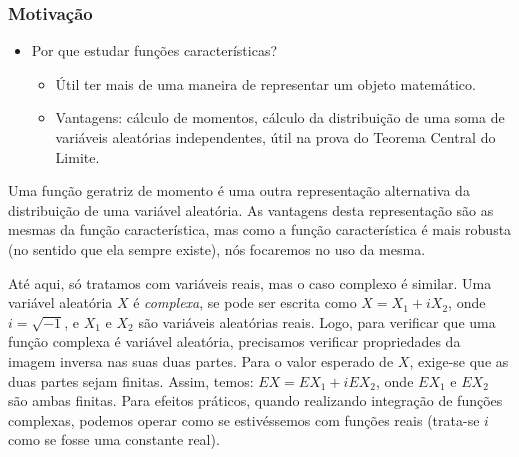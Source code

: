 \begin{frame}
\frametitle{\textbf{Motivação}}

	
	\begin{itemize}
		\item Por que estudar funções características?
		
		\begin{itemize}
			\item Útil ter mais de uma maneira de representar um objeto matemático.
			
			\item Vantagens: cálculo de momentos, cálculo da distribuição de uma soma de variáveis aleatórias independentes, útil na prova do Teorema Central do Limite.
		\end{itemize}
	\end{itemize}
	
	Uma função geratriz de momento é uma outra representação alternativa
	da distribuição de uma variável aleatória. As vantagens desta
	representação são as mesmas da função característica, mas como a
	função característica é mais robusta (no sentido que ela sempre
	existe), nós focaremos no uso da mesma.
	
	\begin{nota}
		Até aqui, só tratamos com variáveis reais, mas o caso complexo é similar. Uma variável aleatória $X$ é {\em complexa}, se pode ser escrita como $X=X_1+iX_2$, onde $i=\sqrt{-1}$, e $X_1$ e $X_2$ são variáveis aleatórias reais. Logo, para verificar que uma função complexa é variável aleatória, precisamos verificar propriedades da imagem inversa nas suas duas partes. Para o valor esperado de $X$, exige-se que as duas partes sejam finitas. Assim, temos: $EX=EX_1+iEX_2$, onde $EX_1$ e $EX_2$ são ambas finitas. Para efeitos práticos, quando realizando integração de funções complexas, podemos operar como se estivéssemos com funções reais (trata-se $i$ como se fosse uma constante real).
		
		\end{nota}
	
\end{frame}





